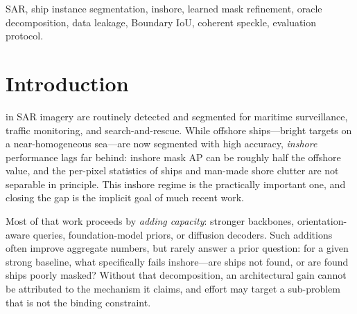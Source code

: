 \documentclass[journal]{IEEEtran}
\begin{document}
\begin{abstract}
pixels with training chips; $10.8\%$ by $\ge\!50\%$ area) with a leakage-free scene-level re-split, and a measurement that the standard Boundary-IoU dilation degenerates to Mask-IoU for the extremely small ships dominating SAR data ($91.5\%$\,/\,$67\%$ of HRSID/PSeg instances), motivating a multi-$d$ report. We deliberately do not claim state-of-the-art on aggregate mask AP; our contribution is a diagnostic framework with an honestly-attributed minimal remedy, a rigorous study of a statistical prior, and a reproducible evaluation protocol.
\end{abstract}

\begin{IEEEkeywords}
SAR, ship instance segmentation, inshore, learned mask refinement, oracle decomposition, data leakage, Boundary IoU, coherent speckle, evaluation protocol.
\end{IEEEkeywords}

\section{Introduction}
\label{sec:intro}
 in SAR imagery are routinely detected and segmented for maritime surveillance, traffic monitoring, and search-and-rescue. While offshore ships---bright targets on a near-homogeneous sea---are now segmented with high accuracy, \emph{inshore} performance lags far behind: inshore mask AP can be roughly half the offshore value, and the per-pixel statistics of ships and man-made shore clutter are not separable in principle. This inshore regime is the practically important one, and closing the gap is the implicit goal of much recent work.

Most of that work proceeds by \emph{adding capacity}: stronger backbones, orientation-aware queries, foundation-model priors, or diffusion decoders. Such additions often improve aggregate numbers, but rarely answer a prior question: for a given strong baseline, what specifically fails inshore---are ships not found, or are found ships poorly masked? Without that decomposition, an architectural gain cannot be attributed to the mechanism it claims, and effort may target a sub-problem that is not the binding constraint.
\end{document}
